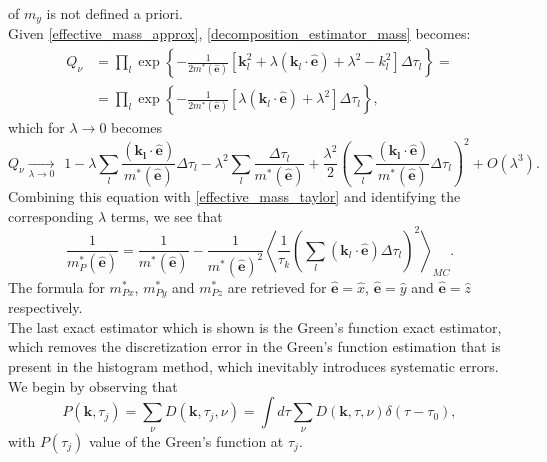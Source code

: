 of $m_y$ is not defined a priori.\\
Given \ref{effective_mass_approx}, \ref{decomposition_estimator_mass} becomes:
\begin{equation}
\begin{split}
    Q_\nu&=\prod_l\exp\left\{-\frac{1}{2m^*(\hat{\mathbf{e}})}\left[\mathbf{k}^2_l+\lambda(\mathbf{k}_l\cdot\hat{\mathbf{e}})+\lambda^2-k^2_l\right]\Delta\tau_l\right\}=\\
    &=\prod_l\exp\left\{-\frac{1}{2m^*(\hat{\mathbf{e}})}\left[\lambda(\mathbf{k}_l\cdot\hat{\mathbf{e}})+\lambda^2\right]\Delta\tau_l\right\},
\end{split}
\end{equation}
which for $\lambda\to 0$ becomes
\begin{equation}
    Q_\nu\xrightarrow[\lambda\to0]{}\hspace{5pt}1-\lambda\sum_l\frac{(\mathbf{k_l\cdot\hat{\mathbf{e}}})}{m^*(\hat{\mathbf{e}})}\Delta\tau_l - \lambda^2\sum_l\frac{\Delta\tau_l}{m^*(\hat{\mathbf{e}})}+\frac{\lambda^2}{2}\left(\sum_l\frac{(\mathbf{k_l\cdot\hat{\mathbf{e}}})}{m^*(\hat{\mathbf{e}})}\Delta\tau_l\right)^2+O(\lambda^3).
\end{equation}
Combining this equation with \ref{effective_mass_taylor} and identifying the corresponding $\lambda$ terms, we see that
\begin{equation}
    \frac{1}{m^*_P(\hat{\mathbf{e}})}=\frac{1}{m^*(\hat{\mathbf{e}})} - \frac{1}{m^*(\hat{\mathbf{e}})^2}\left \langle \frac{1}{\tau_k}\left(\sum_l(\mathbf{k}_l\cdot\hat{\mathbf{e}})\Delta\tau_l\right)^2   \right \rangle_{MC}.
    \label{eff_mass_estimator_new}
\end{equation}
The formula for $m_{Px}^*$, $m_{Py}^*$ and $m_{Pz}^*$ are retrieved for $\hat{\mathbf{e}}=\hat{x}$, $\hat{\mathbf{e}}=\hat{y}$ and $\hat{\mathbf{e}}=\hat{z}$ respectively.\\
The last exact estimator which is shown is the Green's function exact estimator, which removes the discretization error in the Green's function 
estimation that is present in the histogram method, which inevitably introduces systematic errors.\\
We begin by observing that \cite{mishchenko2000diagrammatic}
\begin{equation}
    P(\mathbf{k},\tau_j)=\sum_\nu D(\mathbf{k},\tau_j,\nu)=\int d\tau \sum_\nu D(\mathbf{k},\tau,\nu)\delta(\tau-\tau_0),
\end{equation}
with $P(\tau_j)$ value of the Green's function at $\tau_j$.\\
